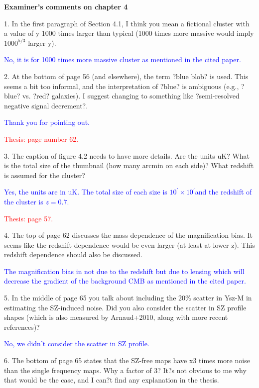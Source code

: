 \documentclass[11pt,a4paper]{article}
\newcommand{\smallboxsize}{$10^{\prime} \times 10^{\prime}$}
\begin{document}
\begin{center}
\textbf{Examiner's comments on chapter 4}
\end{center}

1. In the first paragraph of Section 4.1, I think you mean a fictional cluster with a
value of y 1000 times larger than typical (1000 times more massive would imply
$1000^{5/3}$ larger y).

\textcolor{blue}{No, it is for 1000 times more massive cluster as mentioned in the cited paper.}

2. At the bottom of page 56 (and elsewhere), the term ?blue blob? is used. This
seems a bit too informal, and the interpretation of ?blue? is ambiguous (e.g.,
?blue? vs. ?red? galaxies). I suggest changing to something like ?semi-resolved
negative signal decrement?.

\textcolor{blue}{Thank you for pointing out.}

\textcolor{red}{Thesis: page number 62.}

3. The caption of figure 4.2 needs to have more details. Are the units uK? What is
the total size of the thumbnail (how many arcmin on each side)? What redshift is
assumed for the cluster?

\textcolor{blue}{Yes, the units are in uK. The total size of each size is \smallboxsize and the redshift of the cluster is $z = 0.7$.}

\textcolor{red}{Thesis: page 57.}

4. The top of page 62 discusses the mass dependence of the magnification bias. It
seems like the redshift dependence would be even larger (at least at lower z).
This redshift dependence should also be discussed.

\textcolor{blue}{The magnification bias in not due to the redshift but due to lensing which will decrease the gradient of the background CMB as mentioned in the cited paper.}


5. In the middle of page 65 you talk about including the 20\% scatter in Ysz-M in
estimating the SZ-induced noise. Did you also consider the scatter in SZ profile
shapes (which is also measured by Arnaud+2010, along with more recent
references)?

\textcolor{blue}{No, we didn't consider the scatter in SZ profile.}

6. The bottom of page 65 states that the SZ-free maps have x3 times more noise
than the single frequency maps. Why a factor of 3? It?s not obvious to me why
that would be the case, and I can?t find any explanation in the thesis.
\end{document}
